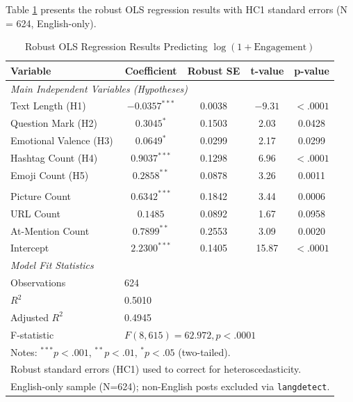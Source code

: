 \documentclass[12pt,a4paper]{article}
\begin{document}
Table \ref{tab:regression_main} presents the robust OLS regression results with HC1 standard errors (N = 624, English-only).

\begin{table}[H]
\centering
\caption{Robust OLS Regression Results Predicting $\log(1+\text{Engagement})$}
\label{tab:regression_main}
\small
\begin{tabular}{lcccc}
\toprule
Variable & Coefficient & Robust SE & t-value & p-value \\
\midrule
\multicolumn{5}{l}{\textit{Main Independent Variables (Hypotheses)}} \\
Text Length (H1) & $-0.0357^{***}$ & 0.0038 & $-9.31$ & $<.0001$ \\
Question Mark (H2) & $0.3045^{*}$ & 0.1503 & 2.03 & 0.0428 \\
Emotional Valence (H3) & $0.0649^{*}$ & 0.0299 & 2.17 & 0.0299 \\
Hashtag Count (H4) & $0.9037^{***}$ & 0.1298 & 6.96 & $<.0001$ \\
Emoji Count (H5) & $0.2858^{**}$ & 0.0878 & 3.26 & 0.0011 \\
\addlinespace
\multicolumn{5}{l}{\textit{Control Variables}} \\
Picture Count & $0.6342^{***}$ & 0.1842 & 3.44 & 0.0006 \\
URL Count & $0.1485$ & 0.0892 & 1.67 & 0.0958 \\
At-Mention Count & $0.7899^{**}$ & 0.2553 & 3.09 & 0.0020 \\
\addlinespace
Intercept & $2.2300^{***}$ & 0.1405 & 15.87 & $<.0001$ \\
\midrule
\multicolumn{5}{l}{\textit{Model Fit Statistics}} \\
Observations & \multicolumn{4}{l}{624} \\
$R^2$ & \multicolumn{4}{l}{0.5010} \\
Adjusted $R^2$ & \multicolumn{4}{l}{0.4945} \\
F-statistic & \multicolumn{4}{l}{$F(8, 615) = 62.972, p < .0001$} \\
\bottomrule
\multicolumn{5}{l}{\small Notes: $^{***} p<.001$, $^{**} p<.01$, $^* p<.05$ (two-tailed).} \\
\multicolumn{5}{l}{\small Robust standard errors (HC1) used to correct for heteroscedasticity.} \\
\multicolumn{5}{l}{\small English-only sample (N=624); non-English posts excluded via \texttt{langdetect}.} \\
\end{tabular}
\end{table}
\end{document}
